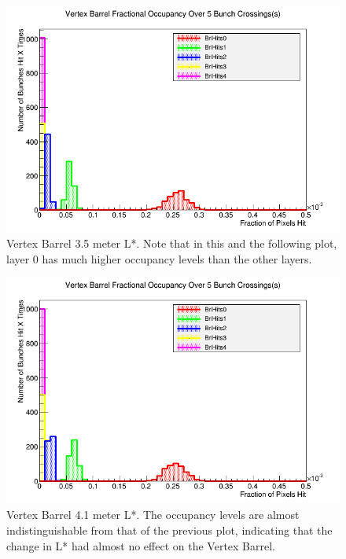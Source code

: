\documentclass{report}
\begin{document}
                \begin{figure}[H]
                    \includegraphics[height=.4\textheight]{Voccupancy_sidloi3_IR_realign_preqd0shift_5B_ps30_1510212229_brl}
                    \centering
                    \caption{Vertex Barrel 3.5 meter L*. Note that in this and the following plot, layer 0 has much higher occupancy levels than the other layers.}
                    \label{fig__lstar_vertex_brl_3.5}
                \end{figure}
                \begin{figure}[H]
                    \includegraphics[height=.4\textheight]{Voccupancy_sidloi3_IR_realign_5B_ps30_1510211229_brl}
                    \centering
                    \caption{Vertex Barrel 4.1 meter L*. The occupancy levels are almost indistinguishable from that of the previous plot, indicating that the change in L* had almost no effect on the Vertex Barrel.}
                    \label{fig__lstar_vertex_brl_4.1}
                \end{figure}
\end{document}
